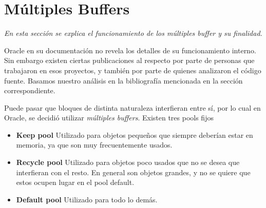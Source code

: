 \section{Múltiples Buffers}

\textsl{En esta secci\'on se explica el funcionamiento de los
múltiples buffer y su finalidad.}

\vspace*{0.5cm}

Oracle en su documentaci\'on no revela los detalles de su funcionamiento 
interno. 
Sin embargo existen ciertas publicaciones al respecto por parte de 
personas que trabajaron en esos proyectos, y tambi\'en por parte de 
quienes analizaron el c\'odigo fuente.
Basamos nuestro análisis en la bibliografía mencionada en la 
sección correspondiente.

\vspace*{0.5cm}

Puede pasar que bloques de distinta naturaleza interfieran entre sí, por lo 
cual en Oracle, se decidió utilizar \textit{m\'ultiples buffers}. 
Existen tres pools fijos

\begin{itemize}
  \item \textbf{Keep pool}
    Utilizado para objetos pequeños que siempre deber\'ian estar en memoria, 
    ya que son muy frecuentemente usados.

  \item \textbf{Recycle pool}
    Utilizado para objetos poco usados que no se desea que interfieran 
    con el resto. En general son objetos grandes, y no se quiere que
    estos ocupen lugar en el pool default.

  \item \textbf{Default pool} 
    Utilizado para todo lo dem\'as.
\end{itemize}




